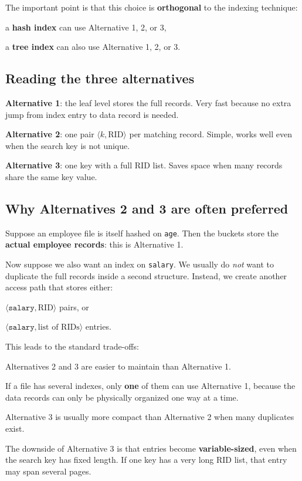 \documentclass[../../dis.tex]{subfiles}
\begin{document}
The important point is that this choice is \textbf{orthogonal} to the indexing technique:
\begin{dashlist}
    \item a \textbf{hash index} can use Alternative 1, 2, or 3,
    \item a \textbf{tree index} can also use Alternative 1, 2, or 3.
\end{dashlist}

\subsection{Reading the three alternatives}
\begin{dashlist}
    \item \textbf{Alternative 1}: the leaf level stores the full records. Very fast because no extra jump from index entry to data record is needed.
    \item \textbf{Alternative 2}: one pair \(\langle k, \text{RID} \rangle\) per matching record. Simple, works well even when the search key is not unique.
    \item \textbf{Alternative 3}: one key with a full RID list. Saves space when many records share the same key value.
\end{dashlist}

\subsection{Why Alternatives 2 and 3 are often preferred}
Suppose an employee file is itself hashed on \texttt{age}. Then the buckets store the \textbf{actual employee records}: this is Alternative 1.

Now suppose we also want an index on \texttt{salary}. We usually do \emph{not} want to duplicate the full records inside a second structure. Instead, we create another access path that stores either:
\begin{dashlist}
    \item \(\langle \texttt{salary}, \text{RID} \rangle\) pairs, or
    \item \(\langle \texttt{salary}, \text{list of RIDs} \rangle\) entries.
\end{dashlist}

This leads to the standard trade-offs:
\begin{dashlist}
    \item Alternatives 2 and 3 are easier to maintain than Alternative 1.
    \item If a file has several indexes, only \textbf{one} of them can use Alternative 1, because the data records can only be physically organized one way at a time.
    \item Alternative 3 is usually more compact than Alternative 2 when many duplicates exist.
    \item The downside of Alternative 3 is that entries become \textbf{variable-sized}, even when the search key has fixed length. If one key has a very long RID list, that entry may span several pages.
\end{dashlist}
\end{document}
